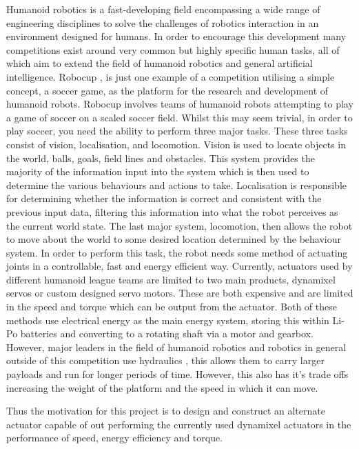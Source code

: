 \documentclass[11pt,a4paper]{article}
\begin{document}
Humanoid robotics is a fast-developing field encompassing a wide range of engineering disciplines to solve the challenges of robotics interaction in an environment designed for humans. In order to encourage this development many competitions exist around very common but highly specific human tasks, all of which aim to extend the field of humanoid robotics and general artificial intelligence. Robocup \cite{kitano1995robocup}, is just one example of a competition utilising a simple concept, a soccer game, as the platform for the research and development of humanoid robots. Robocup involves teams of humanoid robots attempting to play a game of soccer on a scaled soccer field. Whilst this may seem trivial, in order to play soccer, you need the ability to perform three major tasks. These three tasks consist of vision, localisation, and locomotion. Vision is used to locate objects in the world, balls, goals, field lines and obstacles. This system provides the majority of the information input into the system which is then used to determine the various behaviours and actions to take. Localisation is responsible for determining whether the information is correct and consistent with the previous input data, filtering this information into what the robot perceives as the current world state. The last major system, locomotion, then allows the robot to move about the world to some desired location determined by the behaviour system. In order to perform this task, the robot needs some method of actuating joints in a controllable, fast and energy efficient way. Currently, actuators used by different humanoid league teams are limited to two main products, dynamixel servos \cite{robotis_mx106} or custom designed servo motors. These are both expensive and are limited in the speed and torque which can be output from the actuator. Both of these methods use electrical energy as the main energy system, storing this within Li-Po batteries and converting to a rotating shaft via a motor and gearbox. However, major leaders in the field of humanoid robotics and robotics in general outside of this competition use hydraulics \cite{atlas}, this allows them to carry larger payloads and run for longer periods of time. However, this also has it's trade offs increasing the weight of the platform and the speed in which it can move. \newline

Thus the motivation for this project is to design and construct an alternate actuator capable of out performing the currently used dynamixel actuators in the performance of speed, energy efficiency and torque. 
\end{document}
